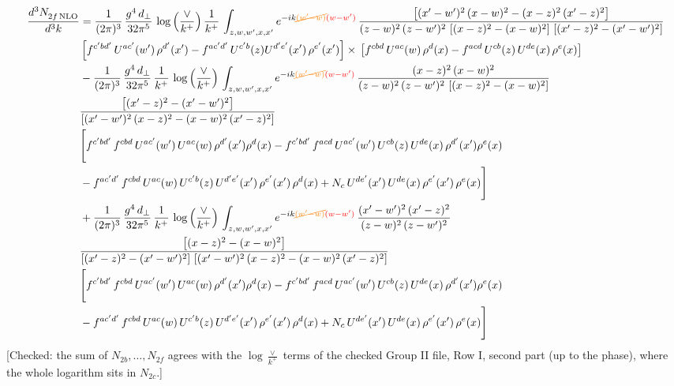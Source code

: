 \documentclass[9pt]{article}
\numberwithin{equation}{section}
\begin{document}
\begin{align}
    \frac{d^{3}N_{2f\,\rm NLO}^{\rm}}{d^{3}k}  & =  \frac{1}{(2\pi)^{3}}\, \frac{g^{4}\,d_{\perp}}{32\pi^{5}}\,\log{\left(\frac{\vee}{k^{+}}\right)}\,\frac{1}{k^{+}}\,\int_{z,w,w^{\prime},x,x'} e^{-ik{\color{orange}\cancel{(w^{\prime}-w)}}{\color{red}(w-w^{\prime})}}\,\frac{\left[(x'-w')^{2}\, (x-w)^{2} - (x-z)^{2}\, (x'-z)^{2}\right]}{(z-w)^{2}\, (z-w')^{2}\,\left[(x-z)^{2} - (x-w)^{2}\right]\, \left[(x'-z)^{2} - (x'-w')^{2}\right]}\notag \\ &   \left[f^{c'bd'}\, U^{ac'}(w')\,\rho^{d'}(x')-f^{ac'd'}\, U^{c'b}(z)U^{d'e'}(x')\, \rho^{e'}(x')\right]\times\, \left[f^{cbd}\, U^{ac}(w)\,\rho^{d}(x) - f^{acd}\, U^{cb}(z)\,U^{de}(x)\, \rho^{e}(x)\right]  \notag \\
& - \frac{1}{(2\pi)^{3}}\, \frac{g^{4}\,d_{\perp}}{32\pi^{5}}\,\frac{1}{k^{+}}\,\log{\left(\frac{\vee}{k^{+}}\right)}\,\int_{z,w,w^{\prime},x,x'} e^{-ik{\color{orange}\cancel{(w^{\prime}-w)}}{\color{red}(w-w^{\prime})}}\,\frac{(x-z)^{2}\, (x-w)^{2}}{(z-w)^{2}\, (z-w')^{2}\,\left[(x-z)^{2} - (x-w)^{2}\right]}\,\notag \\ & \frac{\left[(x'-z)^{2}-(x'-w')^{2}\right]}{\left[(x'-w')^{2}\, (x-z)^{2} - (x-w)^{2}\, (x'-z)^{2}\right]}\notag \\ & \Bigg[f^{c'bd'}\,f^{cbd}\, U^{ac'}(w')\,U^{ac}(w)\,\rho^{d'}(x')\rho^{d}(x)- f^{c'bd'}\,f^{acd}\,U^{ac'}(w')\,U^{cb}(z)\,U^{de}(x)\,\rho^{d'}(x')\rho^{e}(x) \notag \\ & -f^{ac'd'}\,f^{cbd}\,U^{ac}(w)\,U^{c'b}(z)\,U^{d'e'}(x')\,\rho^{e'}(x')\,\rho^{d}(x) +N_{c}\,U^{de'}(x')\,U^{de}(x)\,\rho^{e'}(x')\,\rho^{e}(x)\Bigg]  \notag \\ & + \frac{1}{(2\pi)^{3}}\, \frac{g^{4}\,d_{\perp}}{32\pi^{5}}\,\frac{1}{k^{+}}\,\log{\left(\frac{\vee}{k^{+}}\right)}\,\int_{z,w,w^{\prime},x,x'} e^{-ik{\color{orange}\cancel{(w^{\prime}-w)}}{\color{red}(w-w^{\prime})}}\,\frac{(x'-w')^{2}\, (x'-z)^{2}}{(z-w)^{2}\, (z-w')^{2}}\notag \\ & \frac{\left[(x-z)^{2} - (x-w)^{2}\right]}{\left[(x'-z)^{2} - (x'-w')^{2}\right]\, \left[(x'-w')^{2}\, (x - z)^{2} - (x-w)^{2}\,(x'-z)^{2}\right]}\, \notag \\ &  \Bigg[f^{c'bd'}\,f^{cbd}\, U^{ac'}(w')\,U^{ac}(w)\,\rho^{d'}(x')\rho^{d}(x)- f^{c'bd'}\,f^{acd}\,U^{ac'}(w')\,U^{cb}(z)\,U^{de}(x)\,\rho^{d'}(x')\rho^{e}(x) \notag \\ & -f^{ac'd'}\,f^{cbd}\,U^{ac}(w)\,U^{c'b}(z)\,U^{d'e'}(x')\,\rho^{e'}(x')\,\rho^{d}(x) +N_{c}\,U^{de'}(x')\,U^{de}(x)\,\rho^{e'}(x')\,\rho^{e}(x)\Bigg] 
\end{align} {\color{red}[Checked: the sum of $N_{2b},\dots,N_{2f}$ agrees with the $\log\frac{\vee}{k^{+}}$ terms of the checked Group II file, Row I, second part (up to the phase), where the whole logarithm sits in $N_{2c}$.]}\par\noindent 
\end{document}
